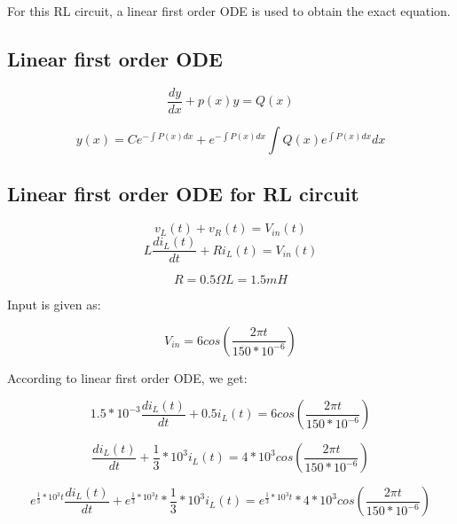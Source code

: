 \documentclass[11pt,a4paper]{article}
\begin{document}
For this RL circuit, a linear first order ODE is used to obtain the exact equation.

\subsection{Linear first order ODE}

\begin{equation}
\frac{dy}{dx}+p(x)y=Q(x)
\end{equation}

\begin{equation}
y(x)=Ce^{-\int{P(x)dx}}+e^{-\int{P(x)dx}}\int{Q(x)e^{\int{P(x)dx}}dx}
\end{equation}

\subsection{Linear first order ODE for RL circuit}

\begin{equation}
v_L(t)+v_R(t)=V_{in}(t)
\end{equation}
\begin{equation}
L\frac{di_L(t)}{dt}+Ri_L(t)=V_{in}(t)
\end{equation}

\begin{equation}
R=0.5\Omega
L=1.5mH
\end{equation}

Input is given as:

\begin{equation}
V_{in}=6cos(\frac{2{\pi}t}{150*{10^{-6}}})
\end{equation}

According to linear first order ODE, we get:

\begin{equation}
1.5*10^{-3}\frac{di_L(t)}{dt}+0.5i_L(t)=6cos(\frac{2{\pi}t}{150*{10^{-6}}})
\end{equation}

\begin{equation}
\frac{di_L(t)}{dt}+\frac{1}{3}*10^3i_L(t)=4*10^3cos(\frac{2{\pi}t}{150*{10^{-6}}})
\end{equation}

\begin{equation}
e^{{\frac{1}{3}*10^3}t}\frac{di_L(t)}{dt}+e^{{\frac{1}{3}*10^3}t}*\frac{1}{3}*10^3i_L(t)=e^{{\frac{1}{3}*10^3}t}*4*10^3cos(\frac{2{\pi}t}{150*{10^{-6}}})
\end{equation}
\end{document}
